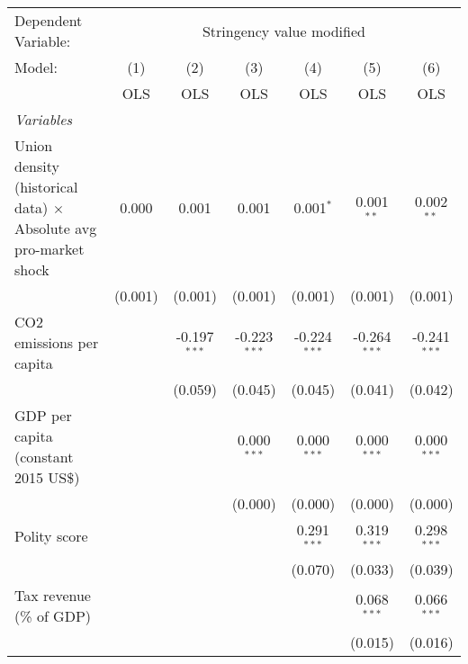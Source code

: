 
\begingroup
\centering
\begin{tabular}{lcccccc}
   \toprule
   Dependent Variable: & \multicolumn{6}{c}{Stringency value modified}\\
   Model:                                                                  & (1)     & (2)            & (3)            & (4)            & (5)            & (6)\\  
                                                                           &  OLS    & OLS            & OLS            & OLS            & OLS            & OLS\\  
   \midrule
   \emph{Variables}\\
   Union density (historical data) $\times$ Absolute avg pro-market shock  & 0.000   & 0.001          & 0.001          & 0.001$^{*}$    & 0.001$^{**}$   & 0.002$^{**}$\\   
                                                                           & (0.001) & (0.001)        & (0.001)        & (0.001)        & (0.001)        & (0.001)\\   
   CO2 emissions per capita                                                &         & -0.197$^{***}$ & -0.223$^{***}$ & -0.224$^{***}$ & -0.264$^{***}$ & -0.241$^{***}$\\   
                                                                           &         & (0.059)        & (0.045)        & (0.045)        & (0.041)        & (0.042)\\   
   GDP per capita (constant 2015 US\$)                                     &         &                & 0.000$^{***}$  & 0.000$^{***}$  & 0.000$^{***}$  & 0.000$^{***}$\\   
                                                                           &         &                & (0.000)        & (0.000)        & (0.000)        & (0.000)\\   
   Polity score                                                            &         &                &                & 0.291$^{***}$  & 0.319$^{***}$  & 0.298$^{***}$\\   
                                                                           &         &                &                & (0.070)        & (0.033)        & (0.039)\\   
   Tax revenue (\% of GDP)                                                 &         &                &                &                & 0.068$^{***}$  & 0.066$^{***}$\\   
                                                                           &         &                &                &                & (0.015)        & (0.016)\\   

\end{tabular}
